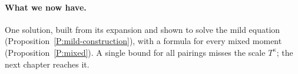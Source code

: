 \paragraph{What we now have.}
One solution, built from its expansion and shown to solve the mild equation
(Proposition~\ref{P:mild-construction}), with a formula for every mixed moment
(Proposition~\ref{P:mixed}). A single bound for all pairings misses the scale
$T^\kappa$; the next chapter reaches it.

